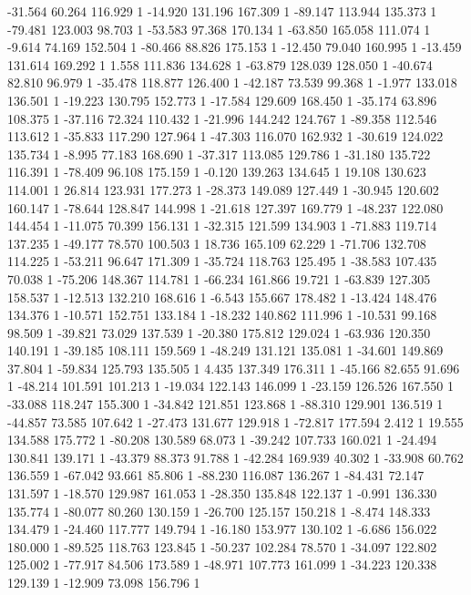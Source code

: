 	-31.564 60.264 116.929 1
	-14.920 131.196 167.309 1
	-89.147 113.944 135.373 1
	-79.481 123.003 98.703 1
	-53.583 97.368 170.134 1
	-63.850 165.058 111.074 1
	-9.614 74.169 152.504 1
	-80.466 88.826 175.153 1
	-12.450 79.040 160.995 1
	-13.459 131.614 169.292 1
	1.558 111.836 134.628 1
	-63.879 128.039 128.050 1
	-40.674 82.810 96.979 1
	-35.478 118.877 126.400 1
	-42.187 73.539 99.368 1
	-1.977 133.018 136.501 1
	-19.223 130.795 152.773 1
	-17.584 129.609 168.450 1
	-35.174 63.896 108.375 1
	-37.116 72.324 110.432 1
	-21.996 144.242 124.767 1
	-89.358 112.546 113.612 1
	-35.833 117.290 127.964 1
	-47.303 116.070 162.932 1
	-30.619 124.022 135.734 1
	-8.995 77.183 168.690 1
	-37.317 113.085 129.786 1
	-31.180 135.722 116.391 1
	-78.409 96.108 175.159 1
	-0.120 139.263 134.645 1
	19.108 130.623 114.001 1
	26.814 123.931 177.273 1
	-28.373 149.089 127.449 1
	-30.945 120.602 160.147 1
	-78.644 128.847 144.998 1
	-21.618 127.397 169.779 1
	-48.237 122.080 144.454 1
	-11.075 70.399 156.131 1
	-32.315 121.599 134.903 1
	-71.883 119.714 137.235 1
	-49.177 78.570 100.503 1
	18.736 165.109 62.229 1
	-71.706 132.708 114.225 1
	-53.211 96.647 171.309 1
	-35.724 118.763 125.495 1
	-38.583 107.435 70.038 1
	-75.206 148.367 114.781 1
	-66.234 161.866 19.721 1
	-63.839 127.305 158.537 1
	-12.513 132.210 168.616 1
	-6.543 155.667 178.482 1
	-13.424 148.476 134.376 1
	-10.571 152.751 133.184 1
	-18.232 140.862 111.996 1
	-10.531 99.168 98.509 1
	-39.821 73.029 137.539 1
	-20.380 175.812 129.024 1
	-63.936 120.350 140.191 1
	-39.185 108.111 159.569 1
	-48.249 131.121 135.081 1
	-34.601 149.869 37.804 1
	-59.834 125.793 135.505 1
	4.435 137.349 176.311 1
	-45.166 82.655 91.696 1
	-48.214 101.591 101.213 1
	-19.034 122.143 146.099 1
	-23.159 126.526 167.550 1
	-33.088 118.247 155.300 1
	-34.842 121.851 123.868 1
	-88.310 129.901 136.519 1
	-44.857 73.585 107.642 1
	-27.473 131.677 129.918 1
	-72.817 177.594 2.412 1
	19.555 134.588 175.772 1
	-80.208 130.589 68.073 1
	-39.242 107.733 160.021 1
	-24.494 130.841 139.171 1
	-43.379 88.373 91.788 1
	-42.284 169.939 40.302 1
	-33.908 60.762 136.559 1
	-67.042 93.661 85.806 1
	-88.230 116.087 136.267 1
	-84.431 72.147 131.597 1
	-18.570 129.987 161.053 1
	-28.350 135.848 122.137 1
	-0.991 136.330 135.774 1
	-80.077 80.260 130.159 1
	-26.700 125.157 150.218 1
	-8.474 148.333 134.479 1
	-24.460 117.777 149.794 1
	-16.180 153.977 130.102 1
	-6.686 156.022 180.000 1
	-89.525 118.763 123.845 1
	-50.237 102.284 78.570 1
	-34.097 122.802 125.002 1
	-77.917 84.506 173.589 1
	-48.971 107.773 161.099 1
	-34.223 120.338 129.139 1
	-12.909 73.098 156.796 1
